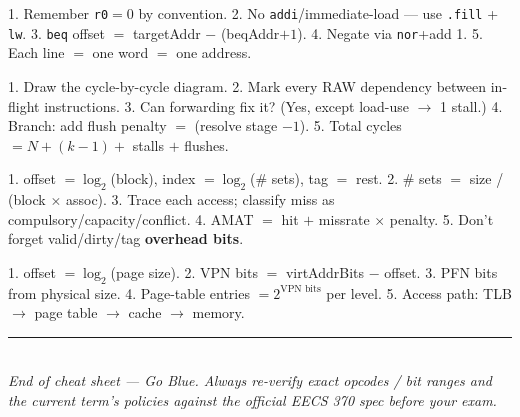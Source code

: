 \documentclass[10pt]{article}
\newcommand{\code}[1]{\texttt{\small #1}}
\begin{document}
\begin{tipbox}
1. Remember \code{r0}$=0$ by convention. 2. No \code{addi}/immediate-load --- use \code{.fill} +
\code{lw}. 3. \code{beq} offset $=$ targetAddr $-$ (beqAddr$+1$). 4. Negate via \code{nor}+add 1.
5. Each line $=$ one word $=$ one address.
\end{tipbox}

\begin{tipbox}
1. Draw the cycle-by-cycle diagram. 2. Mark every RAW dependency between in-flight instructions.
3. Can forwarding fix it? (Yes, except load-use $\to$ 1 stall.) 4. Branch: add flush penalty
$=$ (resolve stage $-1$). 5. Total cycles $= N + (k-1) + $ stalls $+$ flushes.
\end{tipbox}

\begin{tipbox}
1. offset $=\log_2$(block), index $=\log_2$(\# sets), tag $=$ rest. 2. \# sets $=$ size /
(block $\times$ assoc). 3. Trace each access; classify miss as compulsory/capacity/conflict.
4. AMAT $=$ hit $+$ missrate $\times$ penalty. 5. Don't forget valid/dirty/tag \textbf{overhead bits}.
\end{tipbox}

\begin{tipbox}
1. offset $=\log_2$(page size). 2. VPN bits $=$ virtAddrBits $-$ offset. 3. PFN bits from physical
size. 4. Page-table entries $= 2^{\text{VPN bits}}$ per level. 5. Access path:
TLB $\to$ page table $\to$ cache $\to$ memory.
\end{tipbox}

\begin{center}
\vspace{0.4cm}
{\color{umblue}\rule{\textwidth}{2pt}}\\[4pt]
{\small\itshape End of cheat sheet --- Go Blue. Always re-verify exact opcodes / bit ranges and
the current term's policies against the official EECS 370 spec before your exam.}
\end{center}
\end{document}
